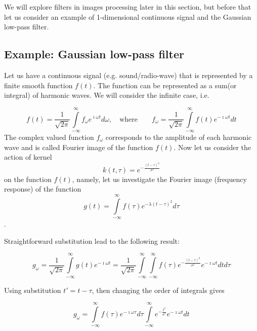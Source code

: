 \documentclass[11pt]{book}
\begin{document}
 We will explore filters in images processing later in this section, but before that let us consider an example of 1-dimensional continuous signal and the Gaussian low-pass filter. 

\subsection{Example: Gaussian low-pass filter}

Let us have a continuous signal (e.g. sound/radio-wave) that is represented by a finite smooth function $f(t)$. The function can be represented as a sum(or integral) of harmonic waves. We will consider the infinite case, i.e.

\begin{equation}
f(t) = \frac{1}{\sqrt{2\pi}}\int\limits_{-\infty}^\infty f_{\omega} e^{\imath\omega t} d\omega,\quad \text{where} \qquad f_{\omega} =\frac{1}{\sqrt{2\pi}} \int\limits_{-\infty}^\infty f(t) e^{-\imath\omega t} dt
\end{equation}      
The complex valued function $f_{\omega}$ corresponds to the amplitude of each harmonic wave and is called Fourier image of the function $f(t)$.
Now let us consider the action of kernel 
\begin{equation}
k(t,\tau) = e^{-\frac{(t-\tau)^2}{\sigma^2}}
\end{equation}
 on the function $f(t)$, namely, let us investigate the Fourier image (frequency response) of the function
\begin{equation}
g(t) = \int\limits_{-\infty}^\infty f(\tau)e^{-\lambda(t-\tau)^2} d\tau 
\end{equation}.

Straightforward substitution lead to the following result:

\begin{equation}
g_\omega = \frac{1}{\sqrt{2\pi}} \int\limits_{-\infty}^\infty g(t) e^{-\imath\omega t} = \frac{1}{\sqrt{2\pi}} \int\limits_{-\infty}^\infty \int\limits_{-\infty}^\infty f(\tau)e^{-\frac{(t-\tau)^2}{\sigma^2}} e^{-\imath\omega t }dt d\tau 
\end{equation}

Using substitution $t' = t - \tau$, then changing the order of integrals gives

\begin{equation}
g_\omega = \int\limits_{-\infty}^\infty f(\tau) e^{-\imath\omega \tau}d\tau \int\limits_{-\infty}^\infty e^{-\frac {t^2}{\sigma^2}} e^{-\imath\omega t }dt
\end{equation}
\end{document}
